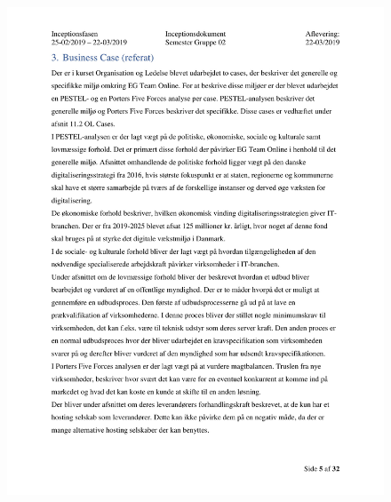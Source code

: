 \begin{figure}[hb]
  \includegraphics[scale = 0.33]{./PNG/Inceptions/Gruppe02+InceptionsDokument-06.jpg} 
\end{figure}

